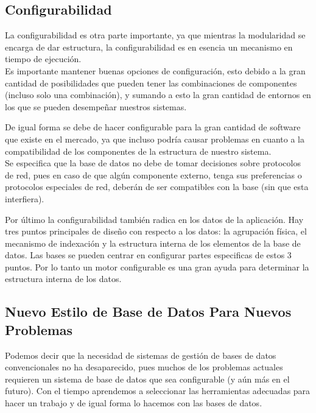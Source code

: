 \documentclass[12pt]{article}
\begin{document}
    \subsection{Configurabilidad}

    La configurabilidad es otra parte importante, ya que mientras la modularidad se encarga de dar estructura, la configurabilidad es en esencia un mecanismo en tiempo de ejecución. \\

    Es importante mantener buenas opciones de configuración, esto debido a la gran cantidad de posibilidades que pueden tener las combinaciones de componentes (incluso solo una combinación), y sumando a esto la gran cantidad de entornos en los que se pueden desempeñar nuestros sistemas.

    De igual forma se debe de hacer configurable para la gran cantidad de software que existe en el mercado, ya que incluso podría causar problemas en cuanto a la compatibilidad de los componentes de la estructura de nuestro sistema. \\

    Se especifica que la base de datos no debe de tomar decisiones sobre protocolos de red, pues en caso de que algún componente externo, tenga sus preferencias o protocolos especiales de red, deberán de ser compatibles con la base (sin que esta interfiera).

    Por último la configurabilidad también radica en los datos de la aplicación. Hay tres puntos principales de diseño con respecto a los datos: la agrupación física, el mecanismo de indexación y la estructura interna de los elementos de la base de datos. Las bases se pueden centrar en configurar partes especificas de estos 3 puntos. Por lo tanto un motor configurable es una gran ayuda para determinar la estructura interna de los datos.

    

    \subsection{Nuevo Estilo de Base de Datos Para Nuevos Problemas}

    Podemos decir que la necesidad de sistemas de gestión de bases de datos convencionales no ha desaparecido, pues muchos de los problemas actuales requieren un sistema de base de datos que sea configurable (y aún más en el futuro). Con el tiempo aprendemos a seleccionar las herramientas adecuadas para hacer un trabajo y de igual forma lo hacemos con las bases de datos. \\
    
\end{document}
